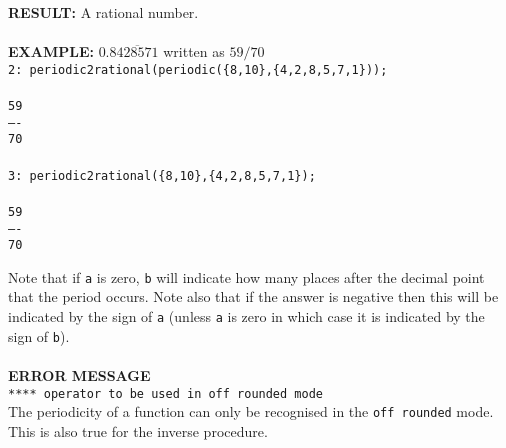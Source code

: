 \begin{tabbing}
{\bf RESULT:}
     \> A rational number.\\ \\

{\bf EXAMPLE:}
    \> $0.8\overline{428571}$ written as $59/70$ \\
    \> {\tt 2: periodic2rational(periodic(\{8,10\},\{4,2,8,5,7,1\}));}
\\ \\
    \> \hspace{1mm} {\tt 59}\\
    \> {\tt ----}\\
    \> \hspace{1mm} {\tt 70}\\ \\
    \> {\tt 3: periodic2rational(\{8,10\},\{4,2,8,5,7,1\});}
\\ \\
    \> \hspace{1mm} {\tt 59}\\
    \> {\tt ----}\\
    \> \hspace{1mm} {\tt 70}
\end{tabbing}

Note that if {\tt a} is zero, {\tt b} will indicate how many places
after the decimal point that the period occurs. Note also that if the answer
is negative then this will be indicated by the sign of {\tt a} (unless
{\tt a} is zero in which case it is indicated by the sign of {\tt b}).
\\ \\


{\bf ERROR MESSAGE}\\

{\tt ***** operator to be used in off rounded mode}\\

The periodicity of a function can only be recognised in
the {\tt off rounded} mode. This is also true for the inverse
procedure.\\ 

